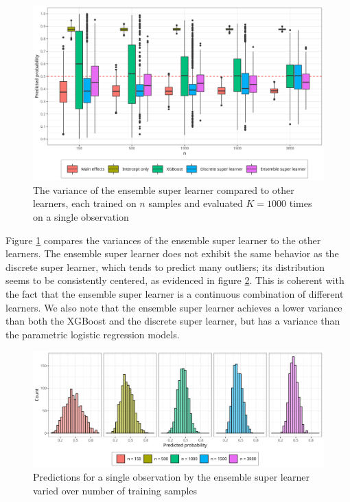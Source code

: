\documentclass[./main.tex]{subfiles}
\begin{document}
\begin{figure}[H]
    \centering
    \includegraphics[width=\textwidth]{figures/learner_vars_w_esl_1000.png}
    \caption{The variance of the ensemble super learner compared to other learners, each trained on $n$ samples and evaluated $ K = 1000 $ times on a single observation}
    \label{fig:learner_vars_w_esl_1000}
\end{figure}
Figure \ref{fig:learner_vars_w_esl_1000} compares the variances of the ensemble super learner to the other learners. The ensemble super learner does not exhibit the same behavior as the discrete super learner, which tends to predict many outliers; its distribution seems to be consistently centered, as evidenced in figure \ref{fig:hist_esl_dist}. This is coherent with the fact that the ensemble super learner is a continuous combination of different learners. We also note that the ensemble super learner achieves a lower variance than both the XGBoost and the discrete super learner, but has a variance than the parametric logistic regression models. 
\begin{figure}[H]
    \centering
    \includegraphics[width=\textwidth]{figures/hist_esl_dist.png}
    \caption{Predictions for a single observation by the ensemble super learner varied over number of training samples}
    \label{fig:hist_esl_dist}
\end{figure}
\end{document}
